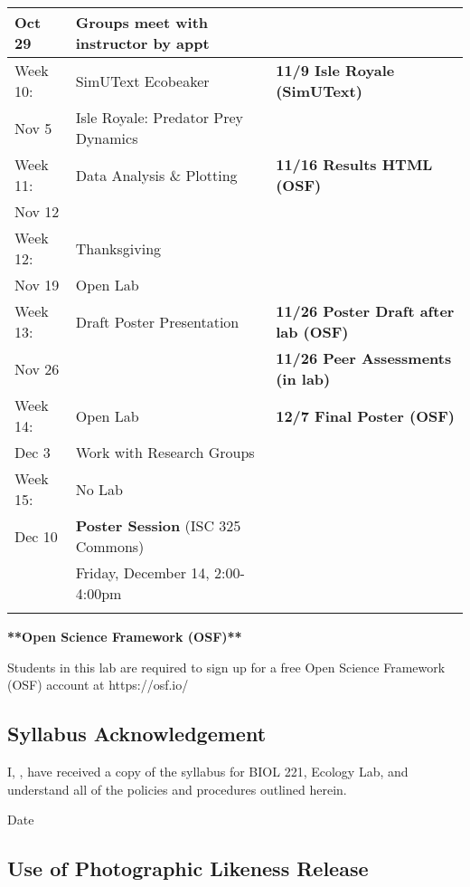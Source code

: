 \documentclass{tufte-handout}
\begin{document}
\begin{tabular}{l l l}
Oct 29 & Groups meet with instructor by appt \\
\hline 
Week 10: & SimUText Ecobeaker & \textbf{11/9 Isle Royale (SimUText)} \\
Nov 5 & Isle Royale: Predator Prey Dynamics & \\
\hline
Week 11: & Data Analysis \& Plotting & \textbf{11/16 Results HTML (OSF)} \\
Nov 12 \\
\hline
Week 12: & Thanksgiving \\
Nov 19 & Open Lab \\
\hline
Week 13: & Draft Poster Presentation & \textbf{11/26 Poster Draft after lab (OSF)}\\
Nov 26 &  & \textbf{11/26 Peer Assessments (in lab)}\\
\hline
Week 14: & Open Lab &  \textbf{12/7 Final Poster (OSF)} \\
Dec 3 & Work with Research Groups &\\
\hline 
Week 15: & No Lab & \\
Dec 10 & \textbf{Poster Session} (ISC 325 Commons) &  \\
 & Friday, December 14, 2:00-4:00pm \\
\hline
\\
\end{tabular}

\begin{fullwidth}

\textbf{**Open Science Framework (OSF)**} 											%

Students in this lab are required to sign up for a free Open Science Framework (OSF) account at https://osf.io/


\end{fullwidth}

\newpage

\subsection{Syllabus Acknowledgement}

I, \underline{\hspace{5cm}}, have received a copy of the syllabus for BIOL 221, Ecology Lab, and understand all of the policies and procedures outlined herein. 

  \underline{\hspace{5cm}} {Date}  \hrulefill


\subsection{Use of Photographic Likeness Release}
\end{document}
